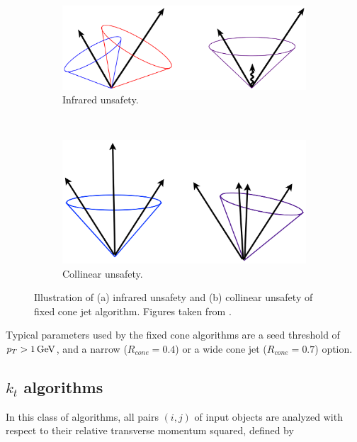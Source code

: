 \begin{figure}[t]
  \centering
  \begin{subfigure}[b]{0.85\textwidth}
    \includegraphics[width=\textwidth]{Chapter2/IRsafety.png}
    \caption{Infrared unsafety.}
    \label{fig:IRsafety}
  \end{subfigure}
  ~
  \begin{subfigure}[b]{0.8\textwidth}
    \includegraphics[width=\textwidth]{Chapter2/ColSafety.png}
    \caption{Collinear unsafety.}
    \label{fig:ColSafety}
  \end{subfigure}
  \caption[Illustration of (a) infrared unsafety and (b) collinear unsafety
          of fixed cone jet algorithm.]
          {Illustration of (a) infrared unsafety and (b) collinear unsafety
          of fixed cone jet algorithm.
          Figures taken from \cite{JetTheoreticalPictures}.}
  \label{fig:JetIRCOLsafety}
\end{figure}

Typical parameters used by the fixed cone algorithms are a seed threshold of $p_{T} > 1 \,\text{GeV}$,
and a narrow ($R_{cone} = 0.4$) or a wide cone jet ($R_{cone} = 0.7$) option.

\subsection{$k_t$ algorithms}

In this class of algorithms, all pairs $(i,j)$ of input objects are analyzed with
respect to their relative transverse momentum squared, defined by 

